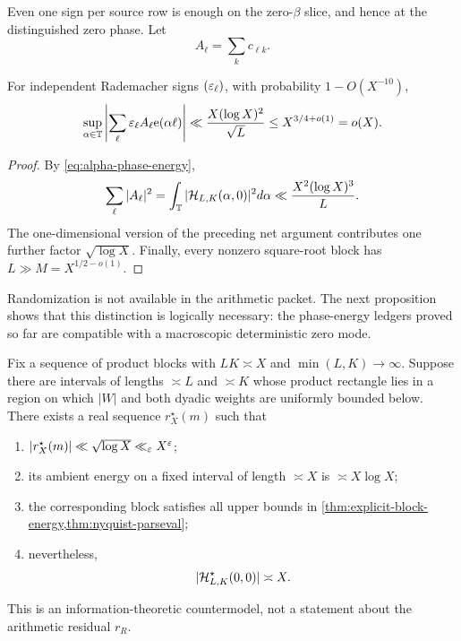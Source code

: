 Even one sign per source row is enough on the zero-$\beta$ slice, and
hence at the distinguished zero phase.  Let
\begin{equation}
 A_\ell=\sum_kc_{\ell k}.
 \label{eq:row-sums-for-randomization}
\end{equation}

\begin{corollary}
\label{cor:random-row-cancellation}
For independent Rademacher signs $(\varepsilon_\ell)$, with probability
$1-O(X^{-10})$,
\begin{equation}
 \sup_{\alpha\in\mathbb T}
 \left|\sum_\ell\varepsilon_\ell A_\ell\mathrm e(\alpha\ell)\right|
 \ll \frac{X(\log X)^2}{\sqrt L}
 \le X^{3/4+o(1)}=o(X).
 \label{eq:random-row-uniform-bound}
\end{equation}
\end{corollary}

\begin{proof}
By \eqref{eq:alpha-phase-energy},
\begin{equation}
 \sum_\ell|A_\ell|^2
 =\int_\mathbb T|\mathcal H_{L,K}(\alpha,0)|^2d\alpha
 \ll\frac{X^2(\log X)^3}{L}.
 \label{eq:row-sum-energy}
\end{equation}
The one-dimensional version of the preceding net argument contributes
one further factor $\sqrt{\log X}$.  Finally, every nonzero square-root
block has $L\gg M=X^{1/2-o(1)}$.
\end{proof}

Randomization is not available in the arithmetic packet.  The next
proposition shows that this distinction is logically necessary: the
phase-energy ledgers proved so far are compatible with a macroscopic
deterministic zero mode.

\begin{proposition}
\label{prop:abstract-countermodel}
Fix a sequence of product blocks with $LK\asymp X$ and
$\min(L,K)\to\infty$.  Suppose there are intervals of lengths
$\asymp L$ and $\asymp K$ whose product rectangle lies in a region on
which $|W|$ and both dyadic weights are uniformly bounded below.
There exists a real sequence $r^\star_X(m)$ such that
\begin{enumerate}[label=\textup{(\roman*)}]
 \item $|r^\star_X(m)|\ll\sqrt{\log X}\ll_\varepsilon X^\varepsilon$;
 \item its ambient energy on a fixed interval of length $\asymp X$ is
       $\asymp X\log X$;
 \item the corresponding block satisfies all upper bounds in
       \cref{thm:explicit-block-energy,thm:nyquist-parseval};
 \item nevertheless,
 \begin{equation}
  |\mathcal H^\star_{L,K}(0,0)|\asymp X.
  \label{eq:countermodel-large-zero}
 \end{equation}
\end{enumerate}
This is an information-theoretic countermodel, not a statement about
the arithmetic residual $r_R$.
\end{proposition}

